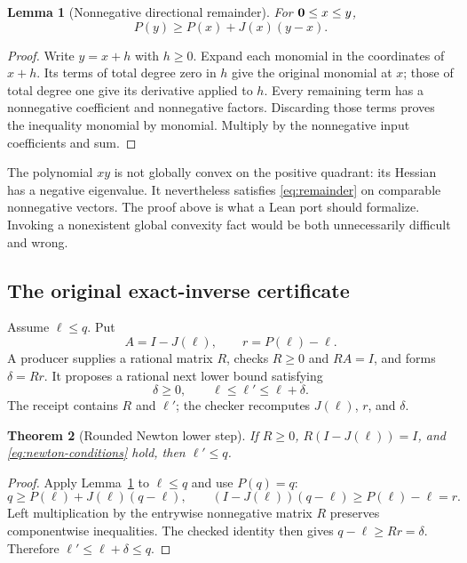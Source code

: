 \documentclass[11pt,a4paper]{article}
\newtheorem{theorem}{Theorem}[section]
\newtheorem{lemma}[theorem]{Lemma}
\theoremstyle{definition}\newtheorem{definition}[theorem]{Definition}
\theoremstyle{remark}\newtheorem{remark}[theorem]{Remark}
\begin{document}
\begin{lemma}[Nonnegative directional remainder]
\label{lem:remainder}
For $\mathbf 0\le x\le y$,
\begin{equation}
 \label{eq:remainder}
 P(y)\ge P(x)+J(x)(y-x).
\end{equation}
\end{lemma}
\begin{proof}
Write $y=x+h$ with $h\ge0$. Expand each monomial in the coordinates of $x+h$. Its terms of total degree zero in $h$ give the original monomial at $x$; those of total degree one give its derivative applied to $h$. Every remaining term has a nonnegative coefficient and nonnegative factors. Discarding those terms proves the inequality monomial by monomial. Multiply by the nonnegative input coefficients and sum.
\end{proof}

The polynomial $xy$ is not globally convex on the positive quadrant: its Hessian has a negative eigenvalue. It nevertheless satisfies \eqref{eq:remainder} on comparable nonnegative vectors. The proof above is what a Lean port should formalize. Invoking a nonexistent global convexity fact would be both unnecessarily difficult and wrong.

\subsection{The original exact-inverse certificate}
Assume $\ell\le q$. Put
\[
 A=I-J(\ell),\qquad r=P(\ell)-\ell.
\]
A producer supplies a rational matrix $R$, checks $R\ge0$ and $RA=I$, and forms $\delta=Rr$. It proposes a rational next lower bound satisfying
\begin{equation}
 \label{eq:newton-conditions}
 \delta\ge0,\qquad \ell\le\ell'\le\ell+\delta.
\end{equation}
The receipt contains $R$ and $\ell'$; the checker recomputes $J(\ell)$, $r$, and $\delta$.

\begin{theorem}[Rounded Newton lower step]
\label{thm:newton}
If $R\ge0$, $R(I-J(\ell))=I$, and \eqref{eq:newton-conditions} hold, then $\ell'\le q$.
\end{theorem}
\begin{proof}
Apply Lemma~\ref{lem:remainder} to $\ell\le q$ and use $P(q)=q$:
\[
 q\ge P(\ell)+J(\ell)(q-\ell),
 \qquad
 (I-J(\ell))(q-\ell)\ge P(\ell)-\ell=r.
\]
Left multiplication by the entrywise nonnegative matrix $R$ preserves componentwise inequalities. The checked identity then gives $q-\ell\ge Rr=\delta$. Therefore $\ell'\le\ell+\delta\le q$.
\end{proof}
\end{document}
